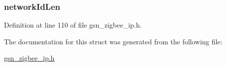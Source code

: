 \hypertarget{a00441_a0995f4868656e4dd69ae4d9ceafc3ea5}{
\subsubsection[{networkIdLen}]{ {\bf networkIdLen}}}
\label{a00441_a0995f4868656e4dd69ae4d9ceafc3ea5}


Definition at line 110 of file gsn\_\-zigbee\_\-ip.h.



The documentation for this struct was generated from the following file:\begin{DoxyCompactItemize}
\item 
\hyperlink{a00618}{gsn\_\-zigbee\_\-ip.h}\end{DoxyCompactItemize}
